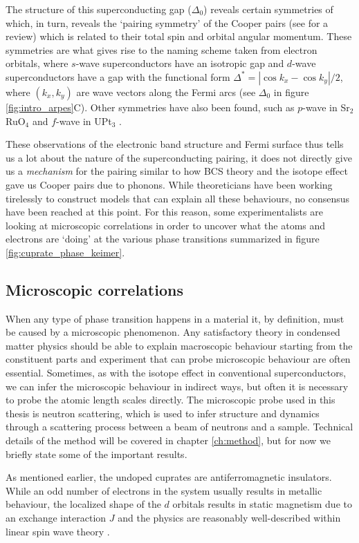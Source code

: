 The structure of this superconducting gap ($\Delta_0$) reveals certain symmetries of which, in turn, reveals the `pairing symmetry' of the Cooper pairs (see \cite{Tsuei2000} for a review) which is related to their total spin and orbital angular momentum. These symmetries are what gives rise to the naming scheme taken from electron orbitals, where $s$-wave superconductors have an isotropic gap and $d$-wave superconductors have a gap with the functional form $\Delta^* = | \cos k_x - \cos k_y | / 2$, where $(k_x, k_y)$ are wave vectors along the Fermi arcs (see $\Delta_0$ in figure \ref{fig:intro_arpes}C). Other symmetries have also been found, such as $p$-wave in Sr$_2$RuO$_4$ \cite{Mackenzie2003} and $f$-wave in UPt$_3$ \cite{Joynt2002}.

These observations of the electronic band structure and Fermi surface thus tells us a lot about the nature of the superconducting pairing, it does not directly give us a \emph{mechanism} for the pairing similar to how BCS theory and the isotope effect gave us Cooper pairs due to phonons. While theoreticians have been working tirelessly to construct models that can explain all these behaviours, no consensus have been reached at this point. For this reason, some experimentalists are looking at microscopic correlations in order to uncover what the atoms and electrons are `doing' at the various phase transitions summarized in figure \ref{fig:cuprate_phase_keimer}.

\subsection{Microscopic correlations}
When any type of phase transition happens in a material it, by definition, must be caused by a microscopic phenomenon. Any satisfactory theory in condensed matter physics should be able to explain macroscopic behaviour starting from the constituent parts and experiment that can probe microscopic behaviour are often essential. Sometimes, as with the isotope effect in conventional superconductors, we can infer the microscopic behaviour in indirect ways, but often it is necessary to probe the atomic length scales directly. The microscopic probe used in this thesis is neutron scattering, which is used to infer structure and dynamics through a scattering process between a beam of neutrons and a sample. Technical details of the method will be covered in chapter \ref{ch:method}, but for now we briefly state some of the important results.

As mentioned earlier, the undoped cuprates are antiferromagnetic insulators. While an odd number of electrons in the system usually results in metallic behaviour, the localized shape of the $d$ orbitals results in static magnetism due to an exchange interaction $J$ and the physics are reasonably well-described within linear spin wave theory \cite{Headings2010}.

